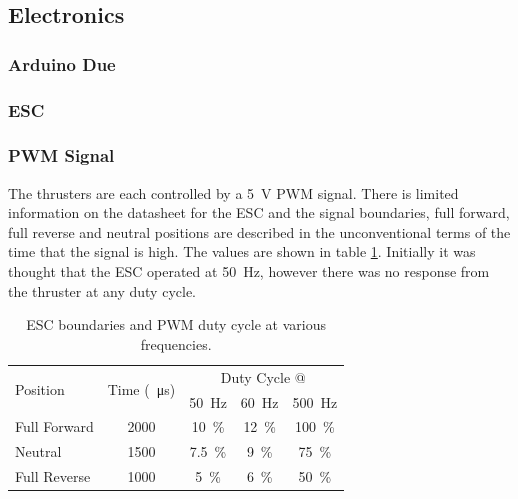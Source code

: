 	\subsection{Electronics}\par
		\subsubsection{Arduino Due}\par
		\subsubsection{ESC}\par
		\subsubsection{PWM Signal}
		The thrusters are each controlled by a \SI{5}{\volt} PWM signal. There is limited information on the datasheet for the ESC and the signal boundaries, full forward, full reverse and neutral positions are described in the unconventional terms of the time that the signal is high. The values are shown in table \ref{tab:3:PWM}. Initially it was thought that the ESC operated at \SI{50}{\hertz}, however there was no response from the thruster at any duty cycle.\par
		\begin{table}[!ht]
			\begin{center}
				\caption{ESC boundaries and PWM duty cycle at various frequencies.}
				\label{tab:3:PWM}
				\begin{tabular}{|l|c|c|c|c|}
					\hline
					\multirow{2}{*}{Position} & \multirow{2}{*}{Time (\SI{}{\micro\second})} & \multicolumn{3}{c|}{Duty Cycle @}\\
					& & \multicolumn{1}{c}{\SI{50}{\hertz}} & \multicolumn{1}{c}{\SI{60}{\hertz}} & \multicolumn{1}{c|}{\SI{500}{\hertz}}\\
					\hline
					Full Forward & 2000 & \SI{10}{\percent} & \SI{12}{\percent} & \SI{100}{\percent}  \\
					\hline
					Neutral & 1500 & \SI{7.5}{\percent} & \SI{9}{\percent} & \SI{75}{\percent}  \\
					\hline
					Full Reverse & 1000 & \SI{5}{\percent} & \SI{6}{\percent} & \SI{50}{\percent}  \\
					\hline
				\end{tabular}
			\end{center}
		\end{table}
